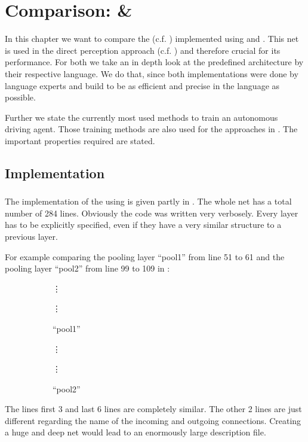 \chapter{Comparison: \cnnarch \& \caffe}\label{chapter: Comparison}

In this chapter we want to compare the \alexnet (c.f. ) implemented using \cnnarch and \caffe. This net is used in the direct perception approach (c.f. ) and therefore crucial for its performance. For both we take an in depth look at the predefined architecture by their respective language. We do that, since both implementations were done by language experts and build to be as efficient and precise in the language as possible.

Further we state the currently most used methods to train an autonomous driving agent. Those training methods are also used for the approaches in . The important properties required are stated.


\section{Implementation} \label{sec: Implementation}

\subsection{\caffe} \label{subsec: Caffe Implementation}
The implementation of the \alexnet using \caffe is given partly in . The whole net has a total number of 284 lines. Obviously the code was written very verbosely. Every layer has to be explicitly specified, even if they have a very similar structure to a previous layer.

For example comparing the pooling layer ``pool1'' from line 51 to 61 and the pooling layer ``pool2'' from line 99 to 109 in :
\begin{figure}[H]
	\centering
	\begin{subfigure}[b]{0.45\textwidth}
		\hspace*{2cm}\vdots
		
		\hspace*{2cm}\vdots
		\caption{``pool1''}
		\label{lst: pool1}
	\end{subfigure}
	\begin{subfigure}[b]{0.45\textwidth}
		\hspace*{2cm}\vdots
		
		\hspace*{2cm}\vdots
		\caption{``pool2''}
		\label{lst: pool2}
	\end{subfigure}
	\caption{}
	\label{lst: pool1 and pool2}
\end{figure}
The lines first 3 and last 6 lines are completely similar. The other 2 lines are just different regarding the name of the incoming and outgoing connections. Creating a huge and deep net would lead to an enormously large description file. 

